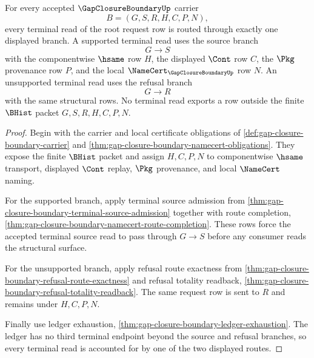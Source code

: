 \begin{theorem}
\label{thm:gap-closure-boundary-terminal-route-totality}
For every accepted $\GapClosureBoundaryUp$ carrier
$$
B=(G,S,R,H,C,P,N),
$$
every terminal read of the root request row is routed through exactly one displayed branch. A supported terminal read uses the source branch
$$
G \longrightarrow S
$$
with the componentwise $\hsame$ row $H$, the displayed $\Cont$ row $C$, the $\Pkg$ provenance row $P$, and the local $\NameCert_{\GapClosureBoundaryUp}$ row $N$. An unsupported terminal read uses the refusal branch
$$
G \longrightarrow R
$$
with the same structural rows. No terminal read exports a row outside the finite $\BHist$ packet $G,S,R,H,C,P,N$.
\end{theorem}
\begin{proof}
Begin with the carrier and local certificate obligations of \autoref{def:gap-closure-boundary-carrier} and \autoref{thm:gap-closure-boundary-namecert-obligations}. They expose the finite $\BHist$ packet and assign $H,C,P,N$ to componentwise $\hsame$ transport, displayed $\Cont$ replay, $\Pkg$ provenance, and local $\NameCert$ naming.

For the supported branch, apply terminal source admission from \autoref{thm:gap-closure-boundary-terminal-source-admission} together with route completion, \autoref{thm:gap-closure-boundary-namecert-route-completion}. These rows force the accepted terminal source read to pass through $G \longrightarrow S$ before any consumer reads the structural surface.

For the unsupported branch, apply refusal route exactness from \autoref{thm:gap-closure-boundary-refusal-route-exactness} and refusal totality readback, \autoref{thm:gap-closure-boundary-refusal-totality-readback}. The same request row is sent to $R$ and remains under $H,C,P,N$.

Finally use ledger exhaustion, \autoref{thm:gap-closure-boundary-ledger-exhaustion}. The ledger has no third terminal endpoint beyond the source and refusal branches, so every terminal read is accounted for by one of the two displayed routes.
\end{proof}


